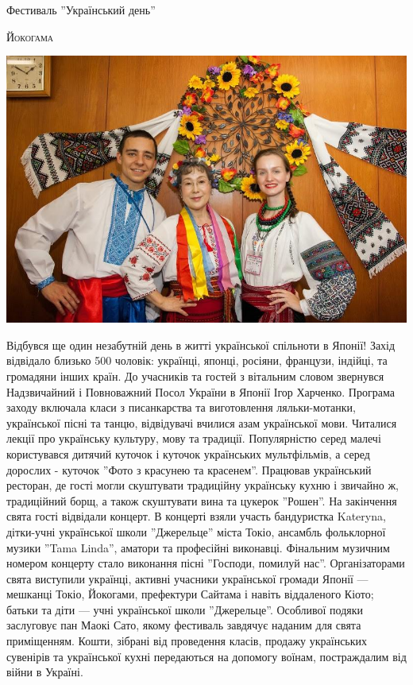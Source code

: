 \documentclass[10pt,a4paper]{article}
\newcommand{\NewsItem}[1]{%
		\usefont{T2A}{iwona}{m}{n} 
		\large #1 \vspace{4pt}
		\par \normalsize \normalfont}
\newcommand{\NewsAuthor}[1]{%
			\hfill \textsc{#1} \vspace{4pt}
			\par \normalfont}
\begin{document}
\begin{multicols}{3}

\NewsItem{Фестиваль ''Український день''}
\NewsAuthor{Йокогама}
		\begin{center}
			\includegraphics[width=0.8\linewidth]{images/ukr-day-fest}
		\end{center}
Відбувся ще один незабутній день в житті української спільноти в Японії!
Захід відвідало близько 500 чоловік: українці, японці, росіяни, французи, індійці, та громадяни інших країн. До учасників та гостей з вітальним словом звернувся Надзвичайний і Повноважний Посол України в Японії Ігор Харченко.
Програма заходу включала класи з писанкарства та виготовлення ляльки-мотанки, української пісні та танцю, відвідувачі вчилися азам української мови. Читалися лекції про українську культуру, мову та традиції. Популярністю серед малечі користувався дитячий куточок і куточок українських мультфільмів, а серед дорослих - куточок ''Фото з красунею та красенем''.
Працював український ресторан, де гості могли скуштувати традиційну українську кухню і звичайно ж, традиційний борщ, а також скуштувати вина та цукерок ''Рошен''. 
На закінчення свята гості відвідали концерт.
В концерті взяли участь бандуристка Kateryna, дітки-учні української школи ''Джерельце'' міста Токіо, ансамбль фольклорної музики ''Tama Linda'', аматори та професійні виконавці. Фінальним музичним номером концерту стало виконання пісні ''Господи, помилуй нас''.
Організаторами свята виступили українці, активні учасники української громади Японії — мешканці Токіо, Йокогами, префектури Сайтама і навіть віддаленого Кіото; батьки та діти — учні української школи ''Джерельце''. Особливої подяки заслуговує пан Маокі Сато, якому фестиваль завдячує наданим для свята приміщенням.
Кошти, зібрані від проведення класів, продажу українських сувенірів та української кухні передаються на допомогу воїнам, постраждалим від війни в Україні.


\end{multicols}
\end{document}
